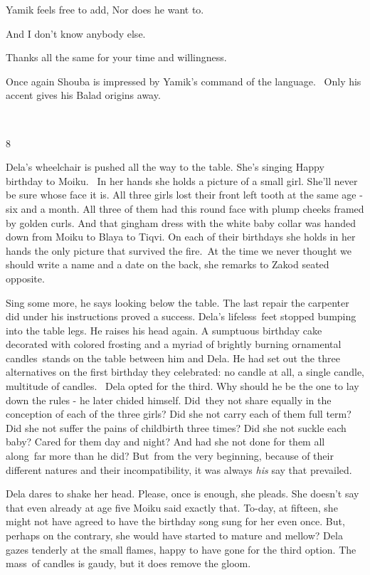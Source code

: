 \documentclass[twoside,11pt]{book}
\begin{document}
Yamik feels free to add, {\textquotedbl}Nor does he want to.{\textquotedbl}\ 

{\textquotedbl}And I don't know anybody else.{\textquotedbl} 

{\textquotedbl}Thanks all the same for your time and willingness.{\textquotedbl}

Once again Shouba is impressed by Yamik's command of the language. \ Only his accent gives his Balad origins away.

~

8 

Dela's wheelchair is pushed all the way to the table. She's singing {\textquotedbl}Happy birthday to
Moiku{\textquotedbl}. ~In her hands she holds a picture of a small girl. She'll never be sure whose face it is. All
three girls lost their front left tooth at the same age - six and a month. All three of them had this round face with
plump cheeks framed by golden curls. And that gingham dress with the white baby collar was handed down from Moiku to
Blaya to Tiqvi. On each of their birthdays she holds in her hands the only picture that survived the
fire.\ {\textquotedbl}At the time we never thought we should write a name and a date on the back,{\textquotedbl} she
remarks to Zakod seated opposite.

{\textquotedbl}Sing some more,{\textquotedbl} he says looking below the table. The last repair the carpenter did under
his instructions proved a success. Dela's lifeless\ feet stopped bumping into the table legs. He raises his head again.
A sumptuous birthday cake decorated with colored frosting and a myriad of brightly burning ornamental candles~stands on
the table between him and Dela. He had set out the three alternatives on the first birthday they celebrated: no candle
at all, a single candle, multitude of candles.~ Dela opted for the third. Why should he be the one to lay down the
rules - he later chided himself. Did~they not share equally in the conception of each of the three girls? Did she not
carry each of them full term? Did she not suffer the pains of childbirth three times? Did she not suckle each baby?
Cared for them day and night? And had she not done for them all along\ far more than he did? But\ from the very
beginning, because of their different natures and their incompatibility, it was always \textit{his} say that
prevailed.\ 

Dela dares to shake her head. {\textquotedbl}Please, once is enough,{\textquotedbl} she pleads. She doesn't say that
even already at age five Moiku said exactly that. To-day, at fifteen, she might not have agreed to have the birthday
song sung for her even once. But, perhaps on the contrary, she would have started to mature and mellow? Dela gazes
tenderly at the small flames, happy to have gone for the third option. The mass\ of candles is gaudy, but it does
remove the gloom.\ 
\end{document}

